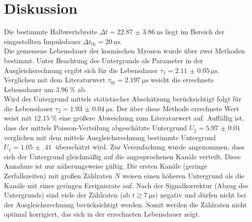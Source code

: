 \section{Diskussion}
\label{sec:Diskussion}
Die bestimmte Halbwertsbreite $\Delta t = \qty{22.87(386)}{\nano\second}$ liegt im Bereich der eingestellten Impulsdauer $\Delta t_\text{th} = \qty{20}{\nano\second}$.
\\
Die gemessene Lebensdauer der kosmischen Myonen wurde über zwei Methoden bestimmt.
Unter Beachtung des Untergrunds als Parameter in der Ausgleichsrechnung ergibt sich für die Lebensdauer $\tau_1 = \qty{2.11(5)}{\micro\second}$.
Verglichen mit dem Literaturwert $\tau_\text{lit} = \qty{2.197}{\micro\second}$\cite{pdg} weicht die errechnete Lebensdauer um $\qty{3.96}{\percent}$ ab.
\\
Wird der Untergrund mittels statistischer Abschätzung berücksichtigt folgt für die Lebensdauer $\tau_2 = \qty{1.93(4)}{\micro\second}$.
Der über diese Methode errechnete Wert weist mit $\qty{12.15}{\percent}$ eine größere Abweichung zum Literaturwert auf.
Auffällig ist, dass der mittels Poisson-Verteilung abgeschätzte Untergrund $U_2 = \qty{5.97(1)}{}$ verglichen mit dem mittels Ausgleichsrechnung bestimmte Untergrund $U_1 = \qty{1.05(41)}{}$ überschätzt wird.
Zur Vereinfachung wurde angenommen, dass sich der Untergrund gleichmäßig auf die angesprochenen Kanäle verteilt.
Diese Annahme ist nur näherungsweise gültig.
Die ersten Kanäle (geringe Zerfallszeiten) mit großen Zählraten $N$ weisen einen höheren Untergrund als die Kanäle mit einer geringen Ereignisrate auf.
Nach der Signalkorrektur (Abzug des Untergrunds) sind viele der Zählraten (ab $t \gtrsim \qty{7}{\micro\second}$) negativ und dürfen nicht bei der Ausgleichsrechnung berücksichtigt werden.
Somit werden die Zählraten nicht optimal korrigiert, das sich in der errechneten Lebensdauer zeigt.